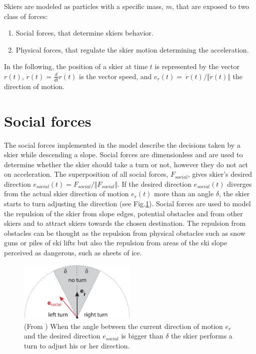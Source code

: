 \documentclass[12pt,a4paper,twoside]{book}
\begin{document}
Skiers are modeled as particles with a specific mass, $m$, that are exposed to two class of forces:\begin{enumerate}
\item Social forces, that determine skiers behavior.
\item Physical forces, that regulate the skier motion determining the acceleration.
\end{enumerate}
In the following, the position of a skier at time $t$ is represented by the vector $r(t)$, $\dot{r}(t)=\frac{d}{dt}r(t)$ is the vector speed, and $e_{\dot{r}}(t)=\ \dot{r}(t) / \Vert \dot{r}(t)\Vert$ the direction of motion.

\section{Social forces}
The social forces implemented in the model describe the decisions taken by a skier while descending a slope. Social forces are dimensionless and are used to determine whether the skier should take a turn or not, however they do not act on acceleration. The superposition of all social forces, $F_{social}$, gives skier's desired direction $e_{social}(t)=F_{social} / \Vert F_{social} \Vert$. If the desired direction $e_{social}(t)$ diverges from the actual skier direction of motion $e_{\dot{r}}(t)$ more than an angle ${\delta}$, the skier starts to turn adjusting the direction (see Fig.\ref{start_turn_pic}). Social forces are used to model the repulsion of the skier from slope edges, potential obstacles and from other skiers and to attract skiers towards the chosen destination. The repulsion from obstacles can be thought as the repulsion from physical obstacles such as snow guns or piles of ski lifts but also the repulsion from areas of the ski slope perceived as dangerous, such as sheets of ice.

\begin{figure}
  \begin{center}
    \includegraphics[width=0.5\textwidth]{images/start_turn_pic.eps}
    \caption{(From \cite{hol2012}) When the angle between the current direction of motion $e_{\dot{r}}$ and the desired direction $e_{social}$ is bigger than $\delta$ the skier performs a turn to adjust his or her direction.}\label{start_turn_pic}
  \end{center}
\end{figure}
\end{document}
